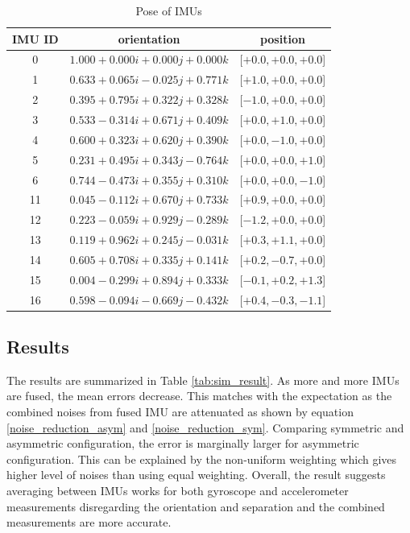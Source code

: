 \documentclass[conference]{IEEEtran}
\begin{document}
\begin{table}[h!]
\centering
\caption{Pose of IMUs}
\label{tab:imu_pose}
\begin{tabular}{ccc}
\toprule
\textbf{IMU ID} & \textbf{orientation} & \textbf{position} \\
\midrule
0      & $1.000 +0.000i +0.000j + 0.000k$ & [$+0.0, +0.0, +0.0$] \\
\midrule
1      & $0.633 +0.065i -0.025j +0.771k$ & [$+1.0, +0.0, +0.0$] \\
2      & $0.395 +0.795i +0.322j +0.328k$ & [$-1.0, +0.0, +0.0$] \\
3      & $0.533 -0.314i +0.671j +0.409k$ & [$+0.0, +1.0, +0.0$] \\
4      & $0.600 +0.323i +0.620j +0.390k$ & [$+0.0, -1.0, +0.0$] \\
5      & $0.231 +0.495i +0.343j -0.764k$ & [$+0.0, +0.0, +1.0$] \\
6      & $0.744 -0.473i +0.355j +0.310k$ & [$+0.0, +0.0, -1.0$] \\
\midrule
11     & $0.045 -0.112i +0.670j +0.733k$ & [$+0.9, +0.0, +0.0$] \\
12     & $0.223 -0.059i +0.929j -0.289k$ & [$-1.2, +0.0, +0.0$] \\
13     & $0.119 +0.962i +0.245j -0.031k$ & [$+0.3, +1.1, +0.0$] \\
14     & $0.605 +0.708i +0.335j +0.141k$ & [$+0.2, -0.7, +0.0$] \\
15     & $0.004 -0.299i +0.894j +0.333k$ & [$-0.1, +0.2, +1.3$] \\
16     & $0.598 -0.094i -0.669j -0.432k$ & [$+0.4, -0.3, -1.1$] \\
\bottomrule
\end{tabular}
\end{table}

\subsection{Results}

The results are summarized in Table \ref{tab:sim_result}. As more and more IMUs are fused, the mean errors decrease. This matches with the expectation as the combined noises from fused IMU are attenuated as shown by equation \ref{noise_reduction_asym} and \ref{noise_reduction_sym}. Comparing symmetric and asymmetric configuration, the error is marginally larger for asymmetric configuration. This can be explained by the non-uniform weighting which gives higher level of noises than using equal weighting. Overall, the result suggests averaging between IMUs works for both gyroscope and accelerometer measurements disregarding the orientation and separation and the combined measurements are more accurate.
\end{document}
